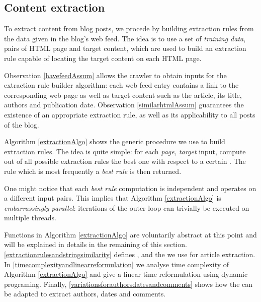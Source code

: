 \subsection{Content extraction}
\label{contentextraction}

To extract content from blog posts, we procede by building extraction rules from the data given in the blog's web feed. The idea is to use a set of \emph{training data}, pairs of HTML page and target content, which are used to build an extraction rule capable of locating the target content on each HTML page.

Observation \ref{havefeedAssum} allows the crawler to obtain inputs for the extraction rule builder algorithm: each web feed entry contains a link to the corresponding web page as well as target content such as the article, its title, authors and publication date. Observation \ref{similarhtmlAssum} guarantees the existence of an appropriate extraction rule, as well as its applicability to all posts of the blog.

Algorithm \ref{extractionAlgo} shows the generic procedure we use to build extraction rules. The idea is quite simple: for each \code{(}\emph{page, target}\code{)} input, compute out of all possible extraction rules the best one with respect to a certain . The rule which is most frequently a \emph{best rule} is then returned.

\extractionAlgo

One might notice that each \emph{best rule} computation is independent and operates on a different input pairs. This implies that Algorithm \ref{extractionAlgo} is \emph{embarrassingly parallel}: iterations of the outer loop can trivially be executed on multiple threads.

Functions in Algorithm \ref{extractionAlgo} are voluntarily abstract at this point and will be explained in details in the remaining of this section. \ref{extractionrulesandstringsimilarity} defines ,  and the  we use for article extraction. In \ref{timecomplexityandlinearreformulation} we analyse time complexity of Algorithm \ref{extractionAlgo} and give a linear time reformulation using dynamic programing. Finally, \ref{variationsforauthorsdatesandcomments} shows how the  can be adapted to extract authors, dates and comments.

